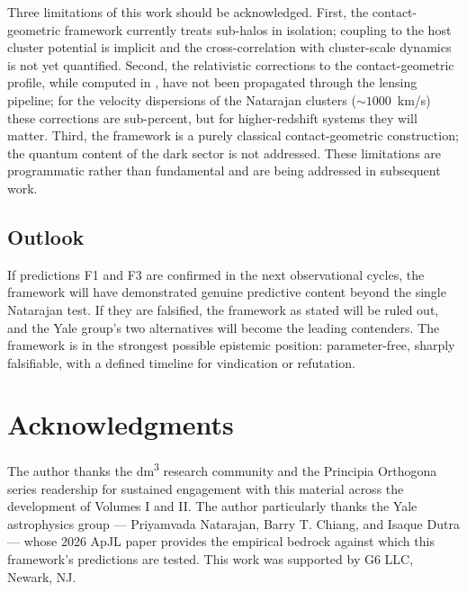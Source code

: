 \documentclass[11pt,a4paper]{article}
\theoremstyle{definition}
\theoremstyle{remark}
\begin{document}
Three limitations of this work should be acknowledged. First, the contact-geometric framework currently treats sub-halos in isolation; coupling to the host cluster potential is implicit and the cross-correlation with cluster-scale dynamics is not yet quantified. Second, the relativistic corrections to the contact-geometric profile, while computed in \citet{principia2026}, have not been propagated through the lensing pipeline; for the velocity dispersions of the Natarajan clusters ($\sim 1000$~km/s) these corrections are sub-percent, but for higher-redshift systems they will matter. Third, the framework is a purely classical contact-geometric construction; the quantum content of the dark sector is not addressed. These limitations are programmatic rather than fundamental and are being addressed in subsequent work.

\subsection{Outlook}

If predictions F1 and F3 are confirmed in the next observational cycles, the framework will have demonstrated genuine predictive content beyond the single Natarajan test. If they are falsified, the framework as stated will be ruled out, and the Yale group's two alternatives will become the leading contenders. The framework is in the strongest possible epistemic position: parameter-free, sharply falsifiable, with a defined timeline for vindication or refutation.

\section*{Acknowledgments}

The author thanks the dm\textsuperscript{3} research community and the Principia Orthogona series readership for sustained engagement with this material across the development of Volumes I and II. The author particularly thanks the Yale astrophysics group --- Priyamvada Natarajan, Barry T. Chiang, and Isaque Dutra --- whose 2026 ApJL paper provides the empirical bedrock against which this framework's predictions are tested. This work was supported by G6 LLC, Newark, NJ.
\end{document}
